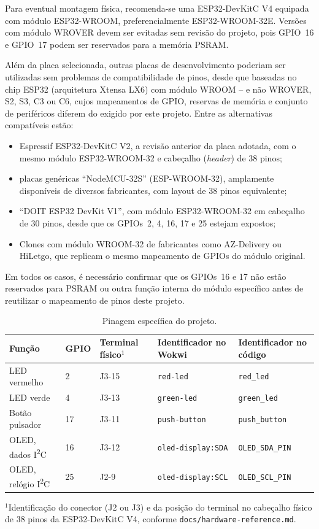 \documentclass[12pt,a4paper]{article}
\begin{document}
Para eventual montagem física, recomenda-se uma ESP32-DevKitC V4 equipada com módulo ESP32-WROOM, preferencialmente ESP32-WROOM-32E. Versões com módulo WROVER devem ser evitadas sem revisão do projeto, pois GPIO~16 e GPIO~17 podem ser reservados para a memória PSRAM.

Além da placa selecionada, outras placas de desenvolvimento poderiam ser utilizadas sem problemas de compatibilidade de pinos, desde que baseadas no chip ESP32 (arquitetura Xtensa LX6) com módulo WROOM -- e não WROVER, S2, S3, C3 ou C6, cujos mapeamentos de GPIO, reservas de memória e conjunto de periféricos diferem do exigido por este projeto. Entre as alternativas compatíveis estão:

\begin{itemize}
  \item Espressif ESP32-DevKitC V2, a revisão anterior da placa adotada, com o mesmo módulo ESP32-WROOM-32 e cabeçalho (\textit{header}) de 38 pinos;
  \item placas genéricas \enquote{NodeMCU-32S} (ESP-WROOM-32), amplamente disponíveis de diversos fabricantes, com layout de 38 pinos equivalente;
  \item \enquote{DOIT ESP32 DevKit V1}, com módulo ESP32-WROOM-32 em cabeçalho de 30 pinos, desde que os GPIOs~2, 4, 16, 17 e 25 estejam expostos;
  \item Clones com módulo WROOM-32 de fabricantes como AZ-Delivery ou HiLetgo, que replicam o mesmo mapeamento de GPIOs do módulo original.
\end{itemize}

Em todos os casos, é necessário confirmar que os GPIOs~16 e 17 não estão reservados para PSRAM ou outra função interna do módulo específico antes de reutilizar o mapeamento de pinos deste projeto.

\begin{table}[htbp]
  \centering
  \caption{Pinagem específica do projeto.}
  \label{tab:pinagem}
  \begin{tabularx}{\textwidth}{@{}Y C{1.6cm} C{2.2cm} Y Y@{}}
    \toprule
    Função & GPIO & Terminal físico$^{1}$ & Identificador no Wokwi & Identificador no código \\
    \midrule
    LED vermelho & 2 & J3-15 & \texttt{red-led} & \texttt{red\_led} \\
    LED verde & 4 & J3-13 & \texttt{green-led} & \texttt{green\_led} \\
    Botão pulsador & 17 & J3-11 & \texttt{push-button} & \texttt{push\_button} \\
    OLED, dados I\textsuperscript{2}C & 16 & J3-12 & \texttt{oled-display:SDA} & \texttt{OLED\_SDA\_PIN} \\
    OLED, relógio I\textsuperscript{2}C & 25 & J2-9 & \texttt{oled-display:SCL} & \texttt{OLED\_SCL\_PIN} \\
    \bottomrule
  \end{tabularx}

  \vspace{0.3em}
  \raggedright\footnotesize
  $^{1}$Identificação do conector (J2 ou J3) e da posição do terminal no cabeçalho físico de 38 pinos da ESP32-DevKitC V4, conforme \texttt{docs/hardware-reference.md}.
\end{table}
\end{document}
